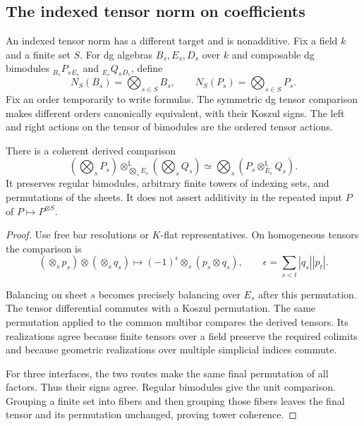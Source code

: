 \subsection{The indexed tensor norm on coefficients}

An indexed tensor norm has a different target and is nonadditive.
Fix a field \(k\) and a finite set \(S\). For
dg algebras $B_s,E_s,D_s$ over $k$ and composable dg bimodules
${}_{B_s}P_s{}_{E_s}$ and ${}_{E_s}Q_s{}_{D_s}$, define
\[
 N_S(B_s)=\bigotimes_{s\in S}B_s,\qquad
 N_S(P_s)=\bigotimes_{s\in S}P_s.
\]
Fix an order temporarily to write formulas. The symmetric dg tensor comparison makes different
orders canonically equivalent, with their Koszul signs. The left and right actions on the tensor
of bimodules are the ordered tensor actions.

\begin{theorem}\label{v4-arith:at:thm:indexed-norm}

There is a coherent derived comparison
\[
 \left(\bigotimes_sP_s\right)
 \otimes^{\mathbb L}_{\bigotimes_sE_s}
 \left(\bigotimes_sQ_s\right)
 \simeq\bigotimes_s(P_s\otimes^{\mathbb L}_{E_s}Q_s).
\]
It preserves regular bimodules, arbitrary finite towers of indexing sets, and permutations of
the sheets. It does not assert additivity in the repeated input $P$ of $P\mapsto P^{\otimes S}$.
\end{theorem}
\begin{proof}
Use free bar resolutions or $K$-flat representatives. On homogeneous tensors the comparison is
\[
 (\otimes_sp_s)\otimes(\otimes_sq_s)
 \longmapsto(-1)^{\epsilon}\otimes_s(p_s\otimes q_s),\qquad
 \epsilon=\sum_{s<t}|q_s||p_t|.
\]

Balancing on sheet $s$ becomes precisely balancing over $E_s$ after this permutation. The tensor
differential commutes with a Koszul permutation. The same permutation applied to the common
multibar compares the derived tensors. Its realizations agree because finite tensors over a
field preserve the required colimits and because geometric realizations over multiple simplicial
indices commute.

For three interfaces, the two routes make the same final permutation of all
factors. Thus their signs agree. Regular bimodules give the unit comparison. Grouping a finite
set into fibers and then grouping those fibers leaves the final tensor and its permutation
unchanged, proving tower coherence.
\end{proof}

